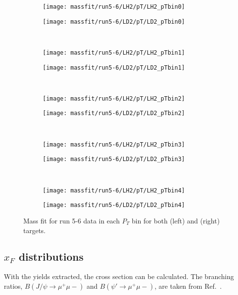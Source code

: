 \documentclass[../main.tex]{subfiles}
\begin{document}
\begin{figure}[h]
	\centering
	\begin{subfigure}{0.4\linewidth}
		\texttt{[image: massfit/run5-6/LH2/pT/LH2\_pTbin0]}
	\end{subfigure}
	\begin{subfigure}{0.4\linewidth}
		\texttt{[image: massfit/run5-6/LD2/pT/LD2\_pTbin0]}
	\end{subfigure}\\
	\begin{subfigure}{0.4\linewidth}
		\texttt{[image: massfit/run5-6/LH2/pT/LH2\_pTbin1]}
	\end{subfigure}
	\begin{subfigure}{0.4\linewidth}
		\texttt{[image: massfit/run5-6/LD2/pT/LD2\_pTbin1]}
	\end{subfigure}\\
	\begin{subfigure}{0.4\linewidth}
		\texttt{[image: massfit/run5-6/LH2/pT/LH2\_pTbin2]}
	\end{subfigure}
	\begin{subfigure}{0.4\linewidth}
		\texttt{[image: massfit/run5-6/LD2/pT/LD2\_pTbin2]}
	\end{subfigure}\\
	\begin{subfigure}{0.4\linewidth}
		\texttt{[image: massfit/run5-6/LH2/pT/LH2\_pTbin3]}
	\end{subfigure}
	\begin{subfigure}{0.4\linewidth}
		\texttt{[image: massfit/run5-6/LD2/pT/LD2\_pTbin3]}
	\end{subfigure}\\
	\begin{subfigure}{0.4\linewidth}
		\texttt{[image: massfit/run5-6/LH2/pT/LH2\_pTbin4]}
	\end{subfigure}
	\begin{subfigure}{0.4\linewidth}
		\texttt{[image: massfit/run5-6/LD2/pT/LD2\_pTbin4]}
	\end{subfigure}
	\caption{Mass fit for run 5-6 data in each $P_T$ bin for both (left) and (right) targets. }
	\label{fig:massfit_5-6_pT}
\end{figure}

\subsection{$x_F$ distributions}
With the yields extracted, the cross section can be calculated.
The branching ratios, $B\left(J/\psi\to\mu^+\mu-\right)$
and $B\left(\psi'\to\mu^+\mu-\right)$, are taken from Ref.~\cite{workman2022}.
\end{document}
